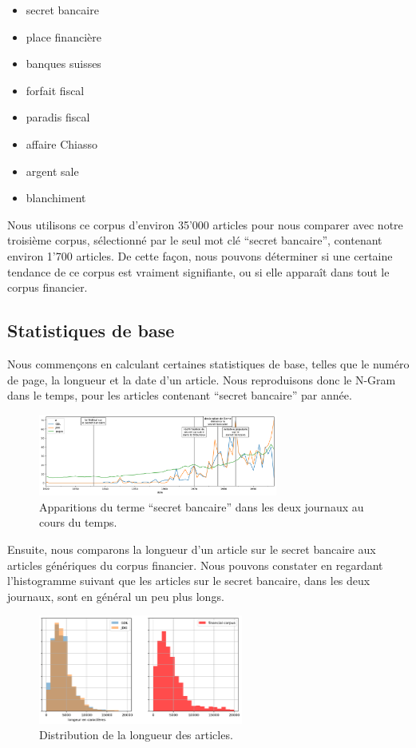 \documentclass[11pt]{article}
\begin{document}
\begin{itemize}
\item
  secret bancaire
\item
  place financière
\item
  banques suisses
\item
  forfait fiscal
\item
  paradis fiscal
\item
  affaire Chiasso
\item
  argent sale
\item
  blanchiment
\end{itemize}

Nous utilisons ce corpus d'environ 35'000 articles pour nous
comparer avec notre troisième corpus, sélectionné par le seul mot clé
``secret bancaire'', contenant environ 1'700 articles. De cette façon,
nous pouvons déterminer si une certaine tendance de ce corpus est
vraiment signifiante, ou si elle apparaît dans tout le corpus financier.

\hypertarget{statistiques-de-base}{%
\subsection{Statistiques de base}\label{statistiques-de-base}}

Nous commençons en calculant certaines statistiques de base, telles que
le numéro de page, la longueur et la date d'un article. Nous
reproduisons donc le N-Gram dans le temps, pour les articles contenant
``secret bancaire'' par année.

\begin{figure}
\centering
\includegraphics[width=0.7\textwidth]{methodology/ngram_ts.png}
\caption{Apparitions du terme ``secret bancaire'' dans les deux journaux
au cours du temps.}
\end{figure}

Ensuite, nous comparons la longueur d'un article sur le secret bancaire
aux articles génériques du corpus financier. Nous pouvons constater en
regardant l'histogramme suivant que les articles sur le secret bancaire,
dans les deux journaux, sont en général un peu plus longs.

\begin{figure}
\centering
\includegraphics[width=0.6\textwidth ]{methodology/article_lengths.png}
\caption{Distribution de la longueur des articles.}
\end{figure}
\end{document}
